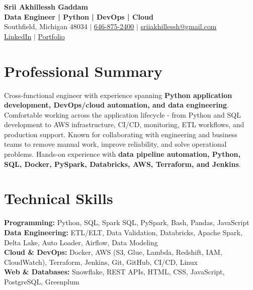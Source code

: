 \documentclass[letterpaper,10pt]{article}
\begin{document}
\fontsize{9.35pt}{10.45pt}\selectfont

\begin{center}
    {\LARGE \textbf{Srii Akhillessh Gaddam}} \\[-1pt]
    \textbf{Data Engineer | Python | DevOps | Cloud} \\[2pt]
    Southfield, Michigan 48034 $|$
    \href{tel:6468752400}{646-875-2400} $|$
    \href{mailto:sriiakhillessh@gmail.com}{sriiakhillessh@gmail.com} \\[1pt]
    \href{https://www.linkedin.com/in/srii-akhiilessh-gaddam-b48668191/}{LinkedIn} $|$
    \href{https://sriiakhillesshg.github.io/portfolio/}{Portfolio}
\end{center}
\vspace{-8pt}

\section{Professional Summary}
\small{Cross-functional engineer with experience spanning \textbf{Python application development, DevOps/cloud automation, and data engineering}. Comfortable working across the application lifecycle - from Python and SQL development to AWS infrastructure, CI/CD, monitoring, ETL workflows, and production support. Known for collaborating with engineering and business teams to remove manual work, improve reliability, and solve operational problems. Hands-on experience with \textbf{data pipeline automation, Python, SQL, Docker, PySpark, Databricks, AWS, Terraform, and Jenkins}.}

\section{Technical Skills}
\small{
\textbf{Programming:} Python, SQL, Spark SQL, PySpark, Bash, Pandas, JavaScript \\
\textbf{Data Engineering:} ETL/ELT, Data Validation, Databricks, Apache Spark, Delta Lake, Auto Loader, Airflow, Data Modeling \\
\textbf{Cloud \& DevOps:} Docker, AWS (S3, Glue, Lambda, Redshift, IAM, CloudWatch), Terraform, Jenkins, Git, GitHub, CI/CD, Linux \\
\textbf{Web \& Databases:} Snowflake, REST APIs, HTML, CSS, JavaScript, PostgreSQL, Greenplum
}

\end{document}
